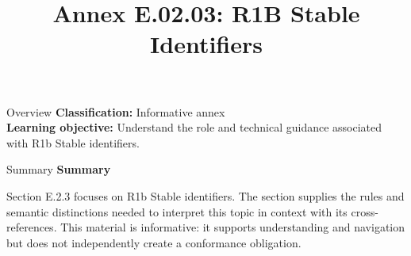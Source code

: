 \documentclass[10pt,letterpaper]{article}
\title{Annex E.02.03: R1B Stable Identifiers}
\author{}
\date{}
\begin{document}
\maketitle
\begin{CornellOverviewBox}{Overview}
\textbf{Classification:} Informative annex\\[2pt]
\textbf{Learning objective:} Understand the role and technical guidance associated with R1b Stable identifiers.
\end{CornellOverviewBox}\begin{CornellSummaryBox}{Summary}
{\sffamily\bfseries\color{Accent} Summary}\par\vspace{3pt}Section E.2.3 focuses on R1b Stable identifiers. The section supplies the rules and semantic distinctions needed to interpret this topic in context with its cross-references. This material is informative: it supports understanding and navigation but does not independently create a conformance obligation.
\end{CornellSummaryBox}
\end{document}
